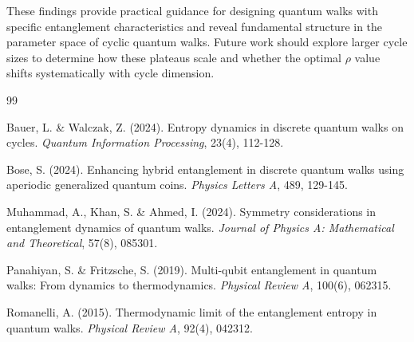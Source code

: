 \documentclass[11pt,a4paper]{article}
\begin{document}
These findings provide practical guidance for designing quantum walks with specific entanglement characteristics and reveal fundamental structure in the parameter space of cyclic quantum walks. Future work should explore larger cycle sizes to determine how these plateaus scale and whether the optimal $\rho$ value shifts systematically with cycle dimension.

\begin{thebibliography}{99}

Bauer, L. \& Walczak, Z. (2024). Entropy dynamics in discrete quantum walks on cycles. \textit{Quantum Information Processing}, 23(4), 112-128.

Bose, S. (2024). Enhancing hybrid entanglement in discrete quantum walks using aperiodic generalized quantum coins. \textit{Physics Letters A}, 489, 129-145.

Muhammad, A., Khan, S. \& Ahmed, I. (2024). Symmetry considerations in entanglement dynamics of quantum walks. \textit{Journal of Physics A: Mathematical and Theoretical}, 57(8), 085301.

Panahiyan, S. \& Fritzsche, S. (2019). Multi-qubit entanglement in quantum walks: From dynamics to thermodynamics. \textit{Physical Review A}, 100(6), 062315.

Romanelli, A. (2015). Thermodynamic limit of the entanglement entropy in quantum walks. \textit{Physical Review A}, 92(4), 042312.

\end{thebibliography}
\end{document}
